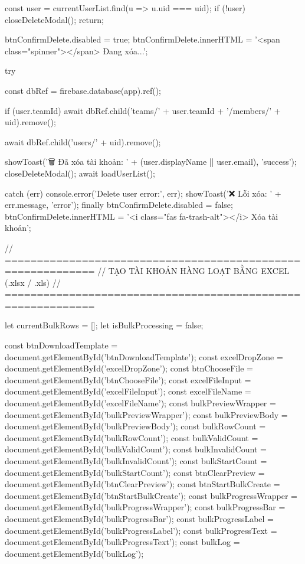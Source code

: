 {{                const user = currentUserList.find(u => u.uid === uid);
                if (!user) {
                    closeDeleteModal();
                    return;
                }

                btnConfirmDelete.disabled = true;
                btnConfirmDelete.innerHTML = '<span class="spinner"></span> Đang xóa...';

                try {
                    const dbRef = firebase.database(app).ref();

                    if (user.teamId) {
                        await dbRef.child('teams/' + user.teamId + '/members/' + uid).remove();
                    }

                    await dbRef.child('users/' + uid).remove();

                    showToast('🗑️ Đã xóa tài khoản: ' + (user.displayName || user.email), 'success');
                    closeDeleteModal();
                    await loadUserList();

                } catch (err) {
                    console.error('Delete user error:', err);
                    showToast('❌ Lỗi xóa: ' + err.message, 'error');
                } finally {
                    btnConfirmDelete.disabled = false;
                    btnConfirmDelete.innerHTML = '<i class="fas fa-trash-alt"></i> Xóa tài khoản';
                }
            }

            // ============================================================
            // TẠO TÀI KHOẢN HÀNG LOẠT BẰNG EXCEL (.xlsx / .xls)
            // ============================================================

            let currentBulkRows = [];
            let isBulkProcessing = false;

            const btnDownloadTemplate = document.getElementById('btnDownloadTemplate');
            const excelDropZone = document.getElementById('excelDropZone');
            const btnChooseFile = document.getElementById('btnChooseFile');
            const excelFileInput = document.getElementById('excelFileInput');
            const excelFileName = document.getElementById('excelFileName');
            const bulkPreviewWrapper = document.getElementById('bulkPreviewWrapper');
            const bulkPreviewBody = document.getElementById('bulkPreviewBody');
            const bulkRowCount = document.getElementById('bulkRowCount');
            const bulkValidCount = document.getElementById('bulkValidCount');
            const bulkInvalidCount = document.getElementById('bulkInvalidCount');
            const bulkStartCount = document.getElementById('bulkStartCount');
            const btnClearPreview = document.getElementById('btnClearPreview');
            const btnStartBulkCreate = document.getElementById('btnStartBulkCreate');
            const bulkProgressWrapper = document.getElementById('bulkProgressWrapper');
            const bulkProgressBar = document.getElementById('bulkProgressBar');
            const bulkProgressLabel = document.getElementById('bulkProgressLabel');
            const bulkProgressText = document.getElementById('bulkProgressText');
            const bulkLog = document.getElementById('bulkLog');

}
